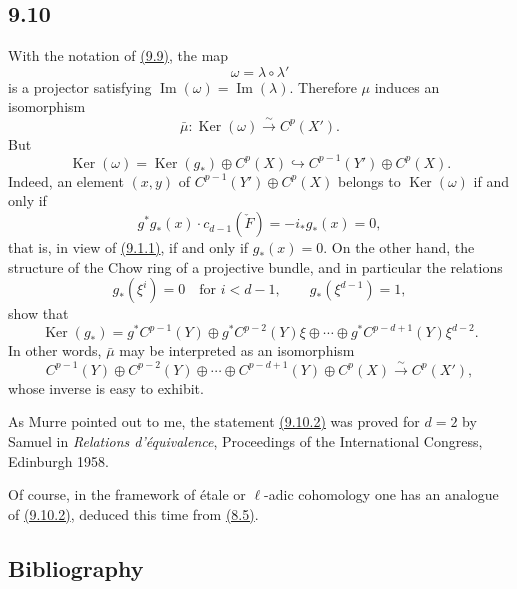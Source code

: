 \documentclass[11pt]{article}
\providecommand{\Ker}{\operatorname{Ker}}
\providecommand{\Ker}{\operatorname{Ker}}
\providecommand{\Ker}{\operatorname{Ker}}
\begin{document}
\subsection*{9.10}\label{sga5:VII:subsection:9.10}

With the notation of \hyperref[sga5:VII:theorem:9.9]{(9.9)}, the map
\[
\omega=\lambda\circ\lambda'
\]
is a projector satisfying $\operatorname{Im}(\omega)=\operatorname{Im}(\lambda)$. Therefore $\mu$ induces an isomorphism
\[
\bar\mu:\Ker(\omega)\xrightarrow{\sim}C^p(X').
\]
But
\[
\Ker(\omega)=\Ker(g_*)\oplus C^p(X)\hookrightarrow C^{p-1}(Y')\oplus C^p(X).
\tag{9.10.1}\label{sga5:VII:equation:9.10.1}
\]
Indeed, an element $(x,y)$ of $C^{p-1}(Y')\oplus C^p(X)$ belongs to $\Ker(\omega)$ if and only if
\[
g^*g_*(x)\cdot c_{d-1}(\check F)=-i_*g_*(x)=0,
\]
that is, in view of \hyperref[sga5:VII:equation:9.1.1]{(9.1.1)}, if and only if $g_*(x)=0$. On the other hand, the structure of the Chow ring of a projective bundle, and in particular the relations
\[
g_*(\xi^i)=0\quad\text{for }i<d-1,\qquad g_*(\xi^{d-1})=1,
\]
show that
\[
\Ker(g_*)=g^*C^{p-1}(Y)\oplus g^*C^{p-2}(Y)\xi\oplus\cdots\oplus g^*C^{p-d+1}(Y)\xi^{d-2}.
\]
In other words, $\bar\mu$ may be interpreted as an isomorphism
\[
C^{p-1}(Y)\oplus C^{p-2}(Y)\oplus\cdots\oplus C^{p-d+1}(Y)\oplus C^p(X)
\xrightarrow{\sim}C^p(X'),
\tag{9.10.2}\label{sga5:VII:equation:9.10.2}
\]
whose inverse is easy to exhibit.

As Murre pointed out to me, the statement \hyperref[sga5:VII:equation:9.10.2]{(9.10.2)} was proved for $d=2$ by Samuel in \emph{Relations d'équivalence}, Proceedings of the International Congress, Edinburgh 1958.

Of course, in the framework of étale or $\ell$-adic cohomology one has an analogue of \hyperref[sga5:VII:equation:9.10.2]{(9.10.2)}, deduced this time from \hyperref[sga5:VII:proposition:8.5]{(8.5)}.

\subsection*{Bibliography}
\end{document}
